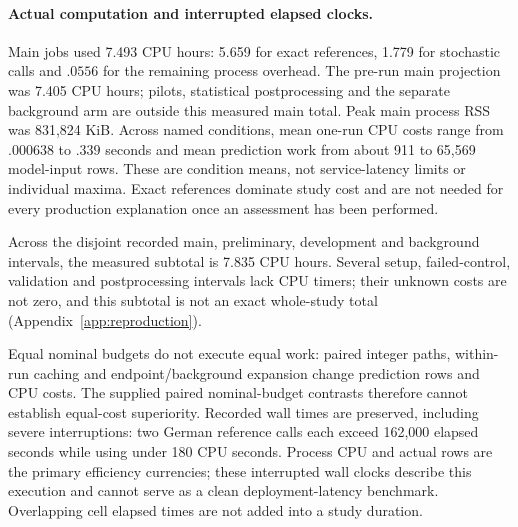 \paragraph{Actual computation and interrupted elapsed clocks.}
Main jobs used 7.493 CPU hours: 5.659 for exact references, 1.779 for stochastic calls and $.0556$ for the remaining process overhead. The pre-run main projection was 7.405 CPU hours; pilots, statistical postprocessing and the separate background arm are outside this measured main total. Peak main process RSS was 831,824 KiB. Across named conditions, mean one-run CPU costs range from $.000638$ to $.339$ seconds and mean prediction work from about 911 to 65,569 model-input rows. These are condition means, not service-latency limits or individual maxima. Exact references dominate study cost and are not needed for every production explanation once an assessment has been performed.

Across the disjoint recorded main, preliminary, development and background intervals, the measured subtotal is 7.835 CPU hours. Several setup, failed-control, validation and postprocessing intervals lack CPU timers; their unknown costs are not zero, and this subtotal is not an exact whole-study total (Appendix~\ref{app:reproduction}).

Equal nominal budgets do not execute equal work: paired integer paths, within-run caching and endpoint/background expansion change prediction rows and CPU costs. The supplied paired nominal-budget contrasts therefore cannot establish equal-cost superiority. Recorded wall times are preserved, including severe interruptions: two German reference calls each exceed 162,000 elapsed seconds while using under 180 CPU seconds. Process CPU and actual rows are the primary efficiency currencies; these interrupted wall clocks describe this execution and cannot serve as a clean deployment-latency benchmark. Overlapping cell elapsed times are not added into a study duration.
